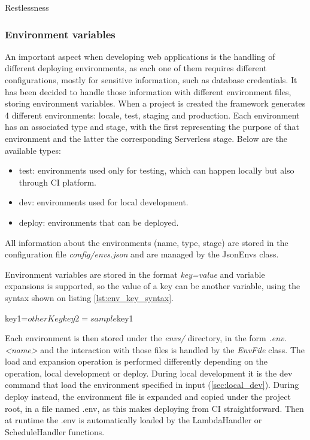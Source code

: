\begin{chapter}{Restlessness}
    \subsubsection{Environment variables}
    \label{sec:env_vars}
    An important aspect when developing web applications is the handling of different
    deploying environments, as each one of them requires different configurations,
    mostly for sensitive information, such as database credentials.
    It has been decided to handle those information with different environment files,
    storing environment variables.
    When a project is created the framework generates 4 different environments: locale,
    test, staging and production. Each environment has an associated type and stage,
    with the first representing the purpose of that environment and the latter the
    corresponding Serverless stage. Below are the available types:
    \begin{itemize}
        \item test: environments used only for testing, which can happen locally
            but also through CI platform.
        \item dev: environments used for local development.
        \item deploy: environments that can be deployed.
    \end{itemize}
    All information about the environments (name, type, stage) are stored in the
    configuration file \textit{config/envs.json} and are managed by the JsonEnvs
    class.

    Environment variables are stored in the format \textit{key=value} and variable
    expansions is supported, so the value of a key can be another variable, using
    the syntax shown on listing \ref{lst:env_key_syntax}.

    \bigskip
    \begin{code}[caption=Environment variable syntax, label={lst:env_key_syntax}]
key1=${otherKey}
key2=sample ${key1}
    \end{code}

    \noindent
    Each environment is then stored under the \mbox{\textit{envs/}} directory, in
    the form \mbox{\textit{.env.<name>}} and the interaction with those files is
    handled by the \textit{EnvFile} class. The load and expansion operation is
    performed differently depending on the operation, local development or deploy.
    During local development it is the dev command that load the environment specified
    in input (\ref{sec:local_dev}). During deploy instead, the environment file
    is expanded and copied under the project root, in a file named .env, as this
    makes deploying from CI straightforward. Then at runtime the .env is automatically
    loaded by the LambdaHandler or ScheduleHandler functions.


\end{chapter}
